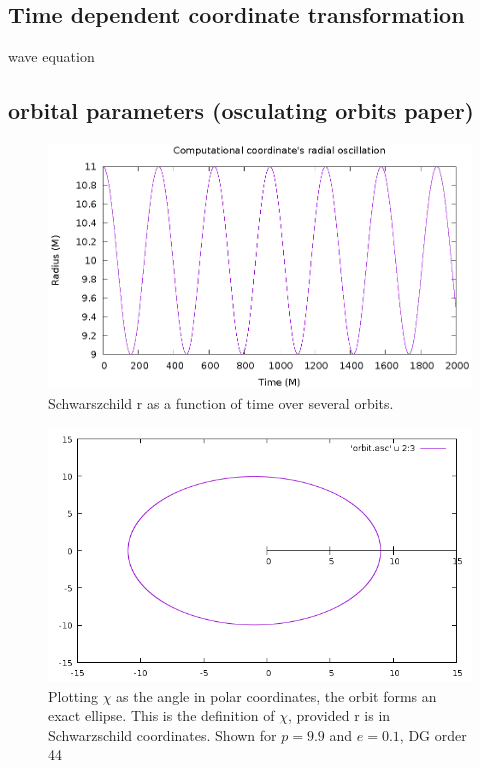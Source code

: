 \subsection{Time dependent coordinate transformation}
wave equation

\subsection{orbital parameters (osculating orbits paper)}

\begin{figure}
  \includegraphics{orbit}
  \caption{Schwarszchild r as a function of time over several orbits.}
\end{figure}

\begin{figure}
  \includegraphics{orbitdg44p99e01}
  \caption{Plotting $\chi$ as the angle in polar coordinates, the orbit forms an exact ellipse. This is the definition of $\chi$, provided r is in Schwarzschild coordinates. Shown for $p=9.9$ and $e=0.1$, DG order 44}
\end{figure}

